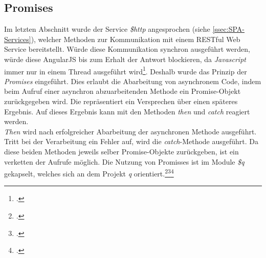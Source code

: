 \subsection{Promises}
\label{ssec:SPA-Promises}
Im letzten Abschnitt wurde der Service \textit{\$http} angesprochen (siehe \ref{ssec:SPA-Services}), welcher Methoden zur Kommunikation mit einem \ac{REST}ful Web Service bereitstellt. Würde diese Kommunikation synchron ausgeführt werden, würde diese AngularJS bis zum Erhalt der Antwort blockieren, da \textit{\gls{Javascript}} immer nur in einem Thread ausgeführt wird\footcite{online:javascript:single-threaded}. Deshalb wurde das Prinzip der \textit{Promises} eingeführt. Dies erlaubt die Abarbeitung von asynchronem Code, indem beim Aufruf einer asynchron abzuarbeitenden Methode ein Promise-Objekt zurückgegeben wird. Die repräsentiert ein Versprechen über einen späteres Ergebnis. Auf dieses Ergebnis kann mit den Methoden \textit{then} und \textit{catch} reagiert werden. \\ 
\textit{Then} wird nach erfolgreicher Abarbeitung der asynchronen Methode ausgeführt. Tritt bei der Verarbeitung ein Fehler auf, wird die \textit{catch}-Methode ausgeführt. Da diese beiden Methoden jeweils selber Promise-Objekte zurückgeben, ist ein verketten der Aufrufe möglich. 
Die Nutzung von Promisses ist im Module \textit{\$q} gekapselt, welches sich an dem Projekt \textit{q} orientiert.\footcite{online:angular:module:q}\footcite{online:doc_q}\footcite[S. 211ff]{book:AngularJs:Steyer2015}
